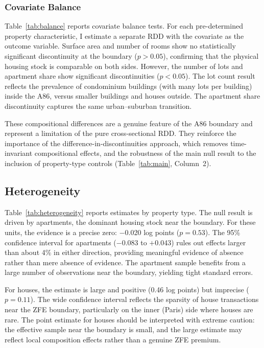 \documentclass[12pt]{article}
\begin{document}
\subsubsection{Covariate Balance}



Table~\ref{tab:balance} reports covariate balance tests. For each pre-determined property characteristic, I estimate a separate RDD with the covariate as the outcome variable. Surface area and number of rooms show no statistically significant discontinuity at the boundary ($p > 0.05$), confirming that the physical housing stock is comparable on both sides. However, the number of lots and apartment share show significant discontinuities ($p < 0.05$). The lot count result reflects the prevalence of condominium buildings (with many lots per building) inside the A86, versus smaller buildings and houses outside. The apartment share discontinuity captures the same urban--suburban transition.

These compositional differences are a genuine feature of the A86 boundary and represent a limitation of the pure cross-sectional RDD. They reinforce the importance of the difference-in-discontinuities approach, which removes time-invariant compositional effects, and the robustness of the main null result to the inclusion of property-type controls (Table~\ref{tab:main}, Column~2).

\subsection{Heterogeneity}



Table~\ref{tab:heterogeneity} reports estimates by property type. The null result is driven by apartments, the dominant housing stock near the boundary. For these units, the evidence is a precise zero: $-$0.020 log points ($p = 0.53$). The 95\% confidence interval for apartments ($-$0.083 to $+$0.043) rules out effects larger than about 4\% in either direction, providing meaningful evidence of absence rather than mere absence of evidence. The apartment sample benefits from a large number of observations near the boundary, yielding tight standard errors.

For houses, the estimate is large and positive (0.46 log points) but imprecise ($p = 0.11$). The wide confidence interval reflects the sparsity of house transactions near the ZFE boundary, particularly on the inner (Paris) side where houses are rare. The point estimate for houses should be interpreted with extreme caution: the effective sample near the boundary is small, and the large estimate may reflect local composition effects rather than a genuine ZFE premium.
\end{document}
